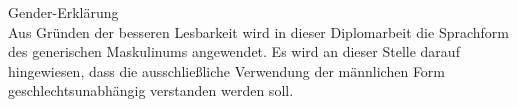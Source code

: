 \null\vfill
{}
{\Large Gender-Erklärung}\\

Aus Gründen der besseren Lesbarkeit wird in dieser Diplomarbeit  die Sprachform des generischen Maskulinums angewendet. Es wird an dieser Stelle darauf hingewiesen, dass die ausschließliche Verwendung der männlichen Form geschlechtsunabhängig verstanden werden soll.   
\vfill\null
\clearpage
